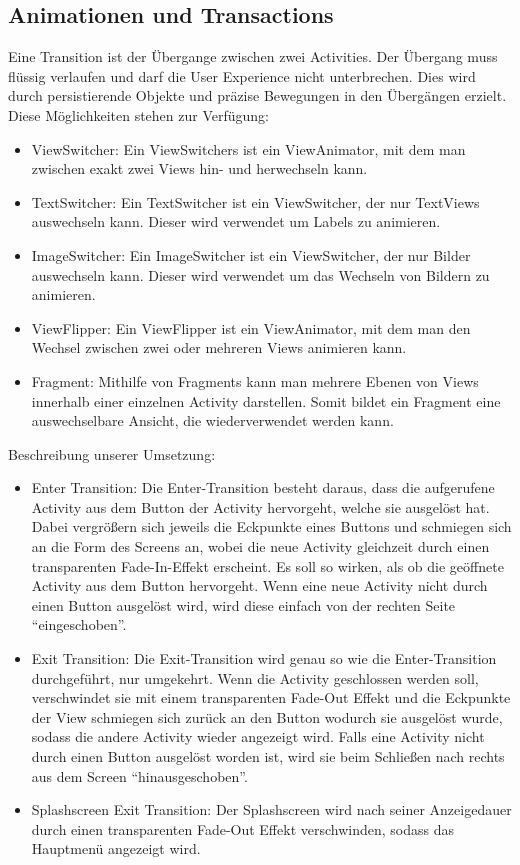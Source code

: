 \documentclass[FIPLY_base.tex]{subfiles}
\begin{document}
\subsection{Animationen und Transactions}
Eine Transition ist der Übergange zwischen zwei Activities.
Der Übergang muss flüssig verlaufen und darf die User Experience nicht unterbrechen. Dies wird durch persistierende Objekte und präzise Bewegungen in den Übergängen erzielt.
Diese Möglichkeiten stehen zur Verfügung:
\begin{itemize}
	\item ViewSwitcher: Ein ViewSwitchers ist ein ViewAnimator, mit dem man zwischen exakt zwei Views hin- und herwechseln kann. 
	\item TextSwitcher: Ein TextSwitcher ist ein ViewSwitcher, der nur TextViews auswechseln kann. Dieser wird verwendet um Labels zu animieren.
	\item ImageSwitcher: Ein ImageSwitcher ist ein ViewSwitcher, der nur Bilder auswechseln kann. Dieser wird verwendet um das Wechseln von Bildern zu animieren.
	\item ViewFlipper: Ein ViewFlipper ist ein ViewAnimator, mit dem man den Wechsel zwischen zwei oder mehreren Views animieren kann.
	\item Fragment: Mithilfe von Fragments kann man mehrere Ebenen von Views innerhalb einer einzelnen Activity darstellen. Somit bildet ein 
	Fragment eine auswechselbare Ansicht, die wiederverwendet werden kann.
\end{itemize}
Beschreibung unserer Umsetzung:
\begin{itemize}
	\item Enter Transition: Die Enter-Transition besteht daraus, dass die aufgerufene Activity aus dem Button der Activity hervorgeht, welche sie ausgelöst hat. Dabei vergrößern sich jeweils die Eckpunkte eines Buttons und schmiegen sich an die Form des Screens an, wobei die neue Activity gleichzeit durch einen transparenten Fade-In-Effekt erscheint. Es soll so wirken, als ob die geöffnete Activity aus dem Button hervorgeht. Wenn eine neue Activity nicht durch einen Button ausgelöst wird, wird diese einfach von der rechten Seite “eingeschoben”.
	\item Exit Transition: Die Exit-Transition wird genau so wie die Enter-Transition    durchgeführt, nur umgekehrt. Wenn die Activity geschlossen werden soll, verschwindet sie mit einem transparenten Fade-Out Effekt und die Eckpunkte der View schmiegen sich zurück an den Button wodurch sie ausgelöst wurde, sodass die andere Activity wieder angezeigt wird. Falls eine Activity nicht durch einen Button ausgelöst worden ist, wird sie beim Schließen nach rechts aus dem Screen “hinausgeschoben”.
	\item Splashscreen Exit Transition: Der Splashscreen wird nach seiner Anzeigedauer durch einen transparenten Fade-Out Effekt verschwinden, sodass das Hauptmenü angezeigt wird.
\end{itemize}
\end{document}
